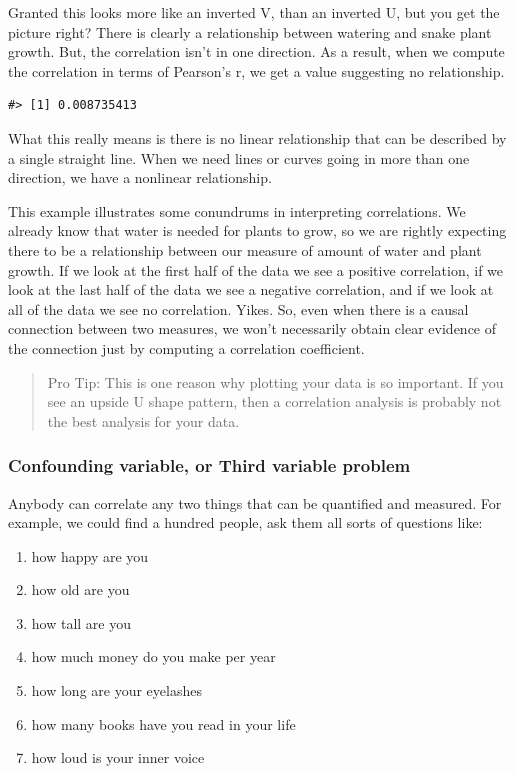 \documentclass[
  letterpaper,
  DIV=11,
  numbers=noendperiod]{scrreprt}
\providecommand{\tightlist}{%
  \setlength{\itemsep}{0pt}\setlength{\parskip}{0pt}}\usepackage{longtable,booktabs,array}
\begin{document}
Granted this looks more like an inverted V, than an inverted U, but you
get the picture right? There is clearly a relationship between watering
and snake plant growth. But, the correlation isn't in one direction. As
a result, when we compute the correlation in terms of Pearson's r, we
get a value suggesting no relationship.

\begin{verbatim}
#> [1] 0.008735413
\end{verbatim}

What this really means is there is no linear relationship that can be
described by a single straight line. When we need lines or curves going
in more than one direction, we have a nonlinear relationship.

This example illustrates some conundrums in interpreting correlations.
We already know that water is needed for plants to grow, so we are
rightly expecting there to be a relationship between our measure of
amount of water and plant growth. If we look at the first half of the
data we see a positive correlation, if we look at the last half of the
data we see a negative correlation, and if we look at all of the data we
see no correlation. Yikes. So, even when there is a causal connection
between two measures, we won't necessarily obtain clear evidence of the
connection just by computing a correlation coefficient.

\begin{quote}
Pro Tip: This is one reason why plotting your data is so important. If
you see an upside U shape pattern, then a correlation analysis is
probably not the best analysis for your data.
\end{quote}

\subsubsection{Confounding variable, or Third variable
problem}\label{confounding-variable-or-third-variable-problem}

Anybody can correlate any two things that can be quantified and
measured. For example, we could find a hundred people, ask them all
sorts of questions like:

\begin{enumerate}
\def\labelenumi{\arabic{enumi}.}
\tightlist
\item
  how happy are you
\item
  how old are you
\item
  how tall are you
\item
  how much money do you make per year
\item
  how long are your eyelashes
\item
  how many books have you read in your life
\item
  how loud is your inner voice
\end{enumerate}
\end{document}
